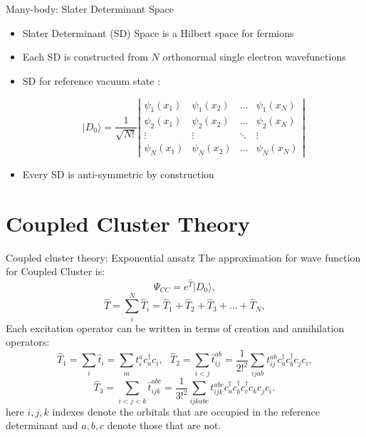 \documentclass{beamer}
\begin{document}
  \begin{frame}{Many-body: Slater Determinant Space}
  \begin{itemize}
  	\item Slater Determinant (SD) Space is a Hilbert space for fermions 
  	\item Each SD is constructed from $N$ orthonormal single electron
  	wavefunctions
  	
  	\item SD for reference vacuum state :
 
  \begin{equation*}
  |D_0\rangle = \frac{1}{\sqrt{N!}}
  \left| \begin{array}{ccccc} \psi_{1}(x_1)& \psi_{1}(x_2)& \dots & \psi_{1}(x_N)\\
  \psi_{2}(x_1)&\psi_{2}(x_2)& \dots  & \psi_{2}(x_N)\\  
  \vdots & \vdots & \ddots  & \vdots \\
  \psi_{N}(x_1)&\psi_{N}(x_2)& \dots  & \psi_{N}(x_N)\end{array} \right| 
  \end{equation*}
  \item Every  SD is anti-symmetric by construction
   \end{itemize}
  \end{frame}

\section{Coupled Cluster Theory}

  \begin{frame}{Coupled cluster theory: Exponential ansatz}
	The approximation for wave function for Coupled Cluster is:
	\begin{equation*}
	\Psi_{CC} =  e^{\hat{T}}|D_0\rangle,
	\end{equation*}
	\begin{equation*}
	\hat{T} = \sum_i^{N} \hat{T}_i  = \hat{T}_1 + \hat{T}_2 +\hat{T}_3 + \dots + \hat{T}_N,
	\end{equation*}
	Each excitation operator can be written in terms of creation and annihilation operators:
	\[ 
	\hat{T}_1 = \sum_{i}\hat{t}_i = \sum_{ia}t_{i}^{a} c^\dag_{a}  c_{i}, \text{    } 
	\hat{T}_2 = \sum_{i<j}\hat{t}_{ij}^{ab} = \frac{1}{2!^2}\sum_{ijab}t_{ij}^{ab} c^\dag_{a} c^\dag_{b} c_{j} c_{i}, 
	\]
	\[ 
	\hat{T}_3 = \sum_{i<j<k}\hat{t}_{ijk}^{abc} = \frac{1}{3!^2}\sum_{ijkabc}t_{ijk}^{abc} c^\dag_{a} c^\dag_{b} c^\dag_{c} c_{k}c_{j} c_{i}.
	\,
	\]
	here $i,j,k$ indexes denote the orbitals that are occupied in the reference determinant and $a,b,c$ denote those that are not.
	\end{frame}
\end{document}
